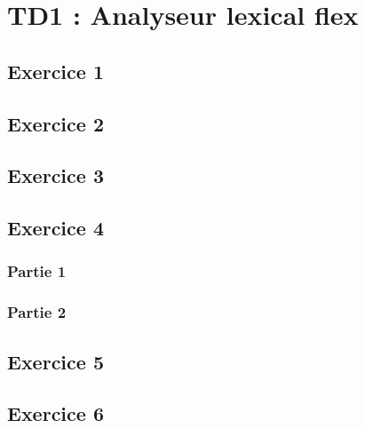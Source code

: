 \chapter{TD1 : Analyseur lexical flex}

\section{Exercice 1}

\section{Exercice 2}

\section{Exercice 3}

\section{Exercice 4}
\subsection{Partie 1}

\subsection{Partie 2}

\section{Exercice 5}

\section{Exercice 6}

